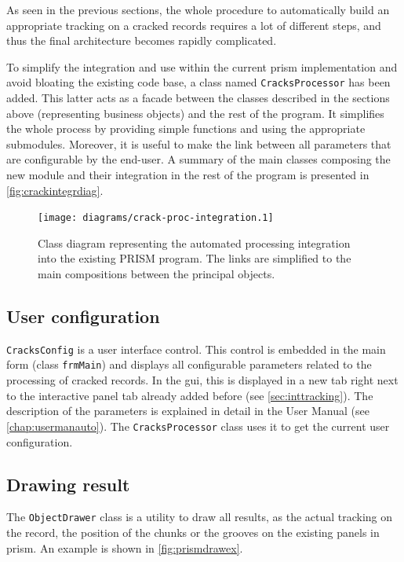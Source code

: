 As seen in the previous sections, the whole procedure to automatically build an appropriate tracking on a cracked records requires a lot of different steps, and thus the final architecture becomes rapidly complicated.

To simplify the integration and use within the current \gls{prism} implementation and avoid bloating the existing code base, a class named \texttt{CracksProcessor} has been added. This latter acts as a facade between the classes described in the sections above (representing business objects) and the rest of the program. It simplifies the whole process by providing simple functions and using the appropriate submodules. Moreover, it is useful to make the link between all parameters that are configurable by the end-user. A summary of the main classes composing the new module and their integration in the rest of the program is presented in \autoref{fig:crackintegrdiag}.

\begin{figure}[!ht]
\centering
\texttt{[image: diagrams/crack-proc-integration.1]}
\caption[Class diagram representing the automated processing integration.]
{Class diagram representing the automated processing integration into the existing PRISM program. The links are simplified to the main compositions between the principal objects.}
\label{fig:crackintegrdiag}
\end{figure}

\subsection{User configuration}

\texttt{CracksConfig} is a user interface control. This control is embedded in the main form (class \texttt{frmMain}) and displays all configurable parameters related to the processing of cracked records. In the \gls{gui}, this is displayed in a new tab right next to the interactive panel tab already added before (see \autoref{sec:inttracking}). The description of the parameters is explained in detail in the User Manual (see \autoref{chap:usermanauto}). The \texttt{CracksProcessor} class uses it to get the current user configuration.

\subsection{Drawing result}

The \texttt{ObjectDrawer} class is a utility to draw all results, as the actual tracking on the record, the position of the chunks or the grooves on the existing panels in \gls{prism}. An example is shown in \autoref{fig:prismdrawex}.

